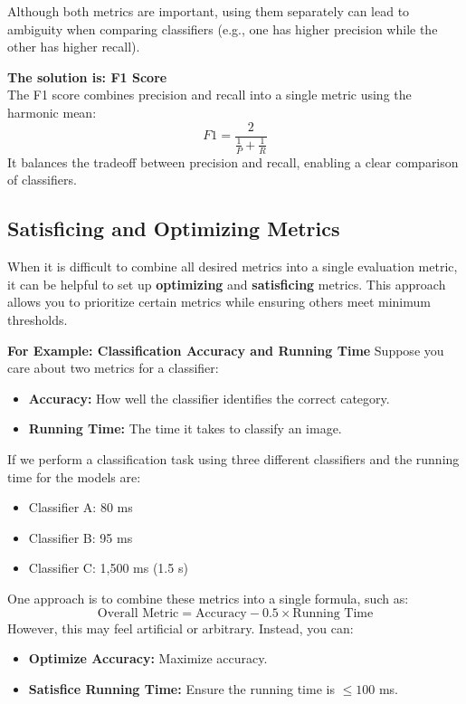 \documentclass[letterpaper,12pt,notitlepage,twoside]{report}
\begin{document}
Although both metrics are important, using them separately can lead to ambiguity when comparing classifiers (e.g., one has higher precision while the other has higher recall).

\textbf{The solution is: F1 Score} \\
The F1 score combines precision and recall into a single metric using the harmonic mean:
\[
F1 = \frac{2}{\frac{1}{P} + \frac{1}{R}}
\]
It balances the tradeoff between precision and recall, enabling a clear comparison of classifiers.

\subsection{Satisficing and Optimizing Metrics}
When it is difficult to combine all desired metrics into a single evaluation metric, it can be helpful to set up \textbf{optimizing} and \textbf{satisficing} metrics. This approach allows you to prioritize certain metrics while ensuring others meet minimum thresholds.

\textbf{For Example: Classification Accuracy and Running Time}
Suppose you care about two metrics for a classifier:
\begin{itemize}[noitemsep, topsep=0pt]
    \item \textbf{Accuracy:} How well the classifier identifies the correct category.
    \item \textbf{Running Time:} The time it takes to classify an image.
\end{itemize}

If we perform a classification task using three different classifiers and the running time for the models are:
\begin{itemize}[noitemsep, topsep=0pt]
    \item Classifier A: 80 ms
    \item Classifier B: 95 ms
    \item Classifier C: 1,500 ms (1.5 s)
\end{itemize}

One approach is to combine these metrics into a single formula, such as:
\[
\text{Overall Metric} = \text{Accuracy} - 0.5 \times \text{Running Time}
\]
However, this may feel artificial or arbitrary. Instead, you can:
\begin{itemize}[noitemsep, topsep=0pt]
    \item \textbf{Optimize Accuracy:} Maximize accuracy.
    \item \textbf{Satisfice Running Time:} Ensure the running time is $\leq 100$ ms.
\end{itemize}
\end{document}
